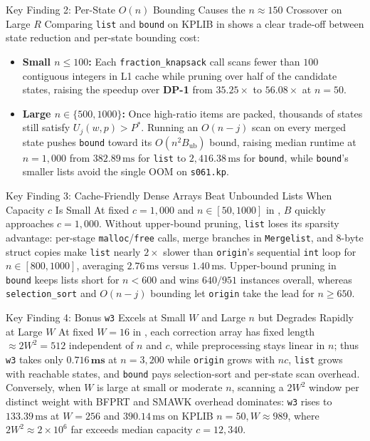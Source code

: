 \documentclass[10pt, a4paper]{article}
\newcommand{\code}[1]{\texttt{\color{primary!90!black}#1}}
\begin{document}
\begin{insightbox}{Key Finding 2: Per-State $O(n)$ Bounding Causes the $n \approx 150$ Crossover on Large $R$}
Comparing \code{list} and \code{bound} on KPLIB in  shows a clear trade-off between state reduction and per-state bounding cost:
\begin{itemize}
  \item \textbf{Small $n \le 100$:} Each \code{fraction\_knapsack} call scans fewer than $100$ contiguous integers in L1 cache while pruning over half of the candidate states, raising the speedup over \textbf{DP-1} from $35.25\times$ to $56.08\times$ at $n=50$.
  \item \textbf{Large $n \in \{500, 1000\}$:} Once high-ratio items are packed, thousands of states still satisfy $U_j(w,p) > P^*$. Running an $O(n - j)$ scan on every merged state pushes \code{bound} toward its $O(n^2 B_{\text{ub}})$ bound, raising median runtime at $n=1{,}000$ from $382.89\,\text{ms}$ for \code{list} to $2{,}416.38\,\text{ms}$ for \code{bound}, while \code{bound}'s smaller lists avoid the single OOM on \code{s061.kp}.
\end{itemize}
\end{insightbox}
\vspace{-0.35em}

\begin{insightbox}{Key Finding 3: Cache-Friendly Dense Arrays Beat Unbounded Lists When Capacity $c$ Is Small}
At fixed $c = 1{,}000$ and $n \in [50, 1000]$ in , $B$ quickly approaches $c = 1{,}000$. Without upper-bound pruning, \code{list} loses its sparsity advantage: per-stage \code{malloc}/\code{free} calls, merge branches in \code{Mergelist}, and 8-byte struct copies make \code{list} nearly $2\times$ slower than \code{origin}'s sequential \code{int} loop for $n \in [800, 1000]$, averaging $2.76\,\text{ms}$ versus $1.40\,\text{ms}$. Upper-bound pruning in \code{bound} keeps lists short for $n < 600$ and wins $640/951$ instances overall, whereas \code{selection\_sort} and $O(n-j)$ bounding let \code{origin} take the lead for $n \ge 650$.
\end{insightbox}
\vspace{-0.35em}

\begin{insightbox}{Key Finding 4: Bonus \code{w3} Excels at Small $W$ and Large $n$ but Degrades Rapidly at Large $W$}
At fixed $W = 16$ in , each correction array has fixed length $\approx 2W^2 = 512$ independent of $n$ and $c$, while preprocessing stays linear in $n$; thus \code{w3} takes only $\mathbf{0.716\,\text{ms}}$ at $n = 3{,}200$ while \code{origin} grows with $nc$, \code{list} grows with reachable states, and \code{bound} pays selection-sort and per-state scan overhead. Conversely, when $W$ is large at small or moderate $n$, scanning a $2W^2$ window per distinct weight with BFPRT and SMAWK overhead dominates: \code{w3} rises to $133.39\,\text{ms}$ at $W = 256$ and $390.14\,\text{ms}$ on KPLIB $n = 50, W \approx 989$, where $2W^2 \approx 2\times 10^6$ far exceeds median capacity $c = 12{,}340$.
\end{insightbox}
\vspace{-0.35em}
\end{document}
